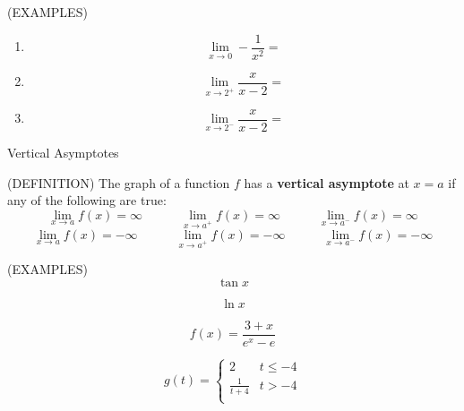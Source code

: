 \documentclass[11pt]{article}
\begin{document}
\vspace{.5in}

(EXAMPLES)

\begin{enumerate}
\item{
  \begin{displaymath}
  \lim_{x\to 0} -\frac{1}{x^2} =
  \end{displaymath}

}

  \vspace{1in}
  
\item{
  \begin{displaymath}
  \lim_{x\to 2^+} \frac{x}{x-2} =
  \end{displaymath}
}

  \vspace{1.5in}
  
\item{  \begin{displaymath}
  \lim_{x\to 2^-} \frac{x}{x-2} =
  \end{displaymath}
}
  

\end{enumerate}
\vspace{.5in}

\pagebreak

\vspace{1in}

\begin{center}
\Large
\rm{Vertical Asymptotes}
\end{center}


(DEFINITION) The graph of a function $f$ has a {\bf vertical asymptote} at $x=a$ if any of the following are true:
 \begin{displaymath}
  \lim_{x\to a} f(x) = \infty \quad\quad\quad \lim_{x\to a^+} f(x) = \infty \quad\quad\quad \lim_{x\to a^-} f(x) = \infty 
  \end{displaymath}
 \begin{displaymath}
  \lim_{x\to a} f(x) = -\infty \quad\quad\quad \lim_{x\to a^+} f(x) = -\infty \quad\quad\quad \lim_{x\to a^-} f(x) = -\infty 
  \end{displaymath}
  

\vspace{.5in}

(EXAMPLES) \\

\begin{displaymath}
\tan{x}
  \end{displaymath}

\vspace{1.5in}

\begin{displaymath}
\ln{x}
  \end{displaymath}

\vspace{1.5in}

\begin{displaymath}
f(x) = \frac{3+x}{e^x-e}
  \end{displaymath}

\vspace{1.5in}

\begin{displaymath}
g(t) =   \left\{ \begin{array}{ll}
2  &  t \le -4\\
\frac{1}{t+4} & t > -4\\
\end{array} \right.
  \end{displaymath}
\end{document}
